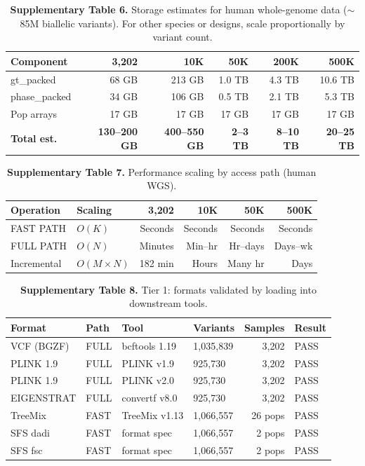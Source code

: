 \documentclass[11pt,a4paper]{article}
\begin{document}
\begin{table}[h]
\caption{\textbf{Supplementary Table 6.} Storage estimates for human whole-genome data ($\sim$85M biallelic variants). For other species or designs, scale proportionally by variant count.}
\begin{tabular}{@{}lrrrrr@{}}
\toprule
Component & 3,202 & 10K & 50K & 200K & 500K \\
\midrule
gt\_packed & 68 GB & 213 GB & 1.0 TB & 4.3 TB & 10.6 TB \\
phase\_packed & 34 GB & 106 GB & 0.5 TB & 2.1 TB & 5.3 TB \\
Pop arrays & 17 GB & 17 GB & 17 GB & 17 GB & 17 GB \\
\textbf{Total est.} & \textbf{130--200 GB} & \textbf{400--550 GB} & \textbf{2--3 TB} & \textbf{8--10 TB} & \textbf{20--25 TB} \\
\bottomrule
\end{tabular}
\end{table}

\begin{table}[h]
\caption{\textbf{Supplementary Table 7.} Performance scaling by access path (human WGS).}
\begin{tabular}{@{}llrrrr@{}}
\toprule
Operation & Scaling & 3,202 & 10K & 50K & 500K \\
\midrule
FAST PATH & $O(K)$ & Seconds & Seconds & Seconds & Seconds \\
FULL PATH & $O(N)$ & Minutes & Min--hr & Hr--days & Days--wk \\
Incremental & $O(M \times N)$ & 182 min & Hours & Many hr & Days \\
\bottomrule
\end{tabular}
\end{table}

\begin{table}[h]
\caption{\textbf{Supplementary Table 8.} Tier 1: formats validated by loading into downstream tools.}
\begin{tabular}{@{}llllrl@{}}
\toprule
Format & Path & Tool & Variants & Samples & Result \\
\midrule
VCF (BGZF) & FULL & bcftools 1.19 & 1,035,839 & 3,202 & PASS \\
PLINK 1.9 & FULL & PLINK v1.9 & 925,730 & 3,202 & PASS \\
PLINK 1.9 & FULL & PLINK v2.0 & 925,730 & 3,202 & PASS \\
EIGENSTRAT & FULL & convertf v8.0 & 925,730 & 3,202 & PASS \\
TreeMix & FAST & TreeMix v1.13 & 1,066,557 & 26 pops & PASS \\
SFS dadi & FAST & format spec & 1,066,557 & 2 pops & PASS \\
SFS fsc & FAST & format spec & 1,066,557 & 2 pops & PASS \\
\bottomrule
\end{tabular}
\end{table}
\end{document}
